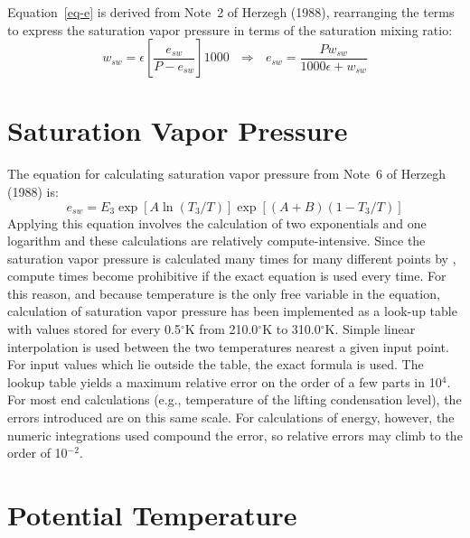Equation~\ref{eq-e} is derived from Note~2 of Herzegh (1988), rearranging
the terms to express the saturation vapor pressure in terms of the saturation
mixing ratio:
\[
	w_{sw} = \epsilon\left[\frac{e_{sw}}{P-e_{sw}}\right]1000 
	~~~\Longrightarrow~~~
	e_{sw} = \frac{Pw_{sw}}{1000\epsilon + w_{sw}}
\]

\section {Saturation Vapor Pressure}
The equation for calculating saturation vapor pressure from Note~6 of Herzegh
(1988) is:
\[
	e_{sw} = E_3 \exp\left[A \ln(T_3/T) \right] 
		\exp\left[(A+B)(1-T_3/T)\right]
\]
Applying this equation involves the calculation of two exponentials and one
logarithm and these calculations are relatively compute-intensive.  Since the
saturation vapor pressure is calculated many times for many different points
by \suds, compute times become prohibitive if the exact equation is used every
time.  For this reason, and because temperature is the only free variable in 
the equation, calculation of saturation vapor pressure has been 
implemented as a look-up table with values stored for every 0.5$^\circ$K from
210.0$^\circ$K to 310.0$^\circ$K.  Simple linear interpolation is used between
the two temperatures nearest a given input point.  For input values which lie
outside the table, the exact formula is used.  The lookup table yields a
maximum relative error on the order of a few parts in 10$^4$.  For most end
calculations (e.g., temperature of the lifting condensation level), the 
errors introduced are on this same scale.  For calculations of energy, however,
the numeric integrations used compound the error, so relative errors may climb
to the order of 10$^{-2}$.

\section {Potential Temperature}

